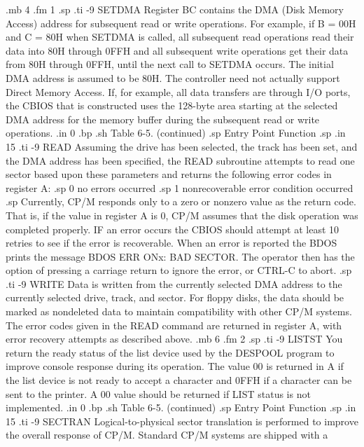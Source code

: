 .mb 4
.fm 1
.sp
.ti -9
SETDMA   Register BC contains the DMA (Disk Memory Access) address for 
subsequent read or write operations.  For example, if B = 00H and C = 80H 
when SETDMA is called, all subsequent read operations read their data into 
80H through 0FFH and all subsequent write operations get their 
data from 80H through 0FFH, until the next call 
to SETDMA occurs.  The initial DMA address is 
assumed to be 80H.  The controller need not 
actually support Direct Memory Access.  If, 
for example, all data transfers are through I/O
ports, the CBIOS that is constructed uses
the 128-byte area starting at the selected DMA
address for the memory buffer during the 
subsequent read or write operations.
.in 0
.bp
.sh
                     Table 6-5.  (continued)
.sp
   Entry Point                    Function
.sp
.in 15
.ti -9
READ     Assuming the drive has been selected, the track
has been set, and the DMA address has been 
specified, the READ subroutine attempts to 
read one sector based upon these parameters         
and returns the following error codes in 
register A:
.sp
0  no errors occurred
.sp
1  nonrecoverable error condition occurred
.sp
Currently, CP/M responds only to a zero or nonzero 
value as the return code.  That is, if the 
value in register A is 0, CP/M assumes that the 
disk operation was completed properly.  IF an
error occurs the CBIOS should attempt
at least 10 retries to see if the error is 
recoverable.  When an error is reported the BDOS 
prints the message BDOS ERR ONx:  BAD   
SECTOR.  The operator then has the option of 
pressing a carriage return to ignore the error, or 
CTRL-C to abort.
.sp
.ti -9
WRITE    Data is written from the currently 
selected DMA address to the currently selected
drive, track, and sector.  For floppy disks, the 
data should be marked as nondeleted data to 
maintain compatibility with other CP/M systems.
The error codes given in the READ command are 
returned in register A, with error recovery 
attempts as described above.
.mb 6
.fm 2
.sp
.ti -9
LISTST   You return the ready status of the list
device used by the DESPOOL program to improve
console response during its operation.  The 
value 00 is returned in A if the list device is 
not ready to accept a character and 0FFH if a 
character can be sent to the printer.  A 00 
value should be returned if LIST status is not
implemented.
.in 0
.bp
.sh
                     Table 6-5.  (continued)
.sp
   Entry Point                    Function
.sp
.in 15
.ti -9
SECTRAN  Logical-to-physical sector 
translation is performed to improve the overall response of
CP/M.  Standard CP/M systems are shipped with a 
